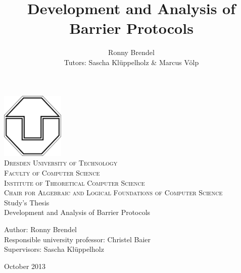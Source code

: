 \documentclass[a4paper, 10pt]{article}
\title{Development and Analysis of Barrier Protocols}
\author{Ronny Brendel\\Tutors: Sascha Kl\"uppelholz \& Marcus V\"olp}
\begin{document}
\begin{titlepage}

\begin{center}
\includegraphics[width=3cm]{tu-logo}~\\[1cm]
\textsc{\LARGE Dresden University of Technology}\\[0.5cm]
\textsc{\Large Faculty of Computer Science}\\[0.2cm]
\textsc{\large Institute of Theoretical Computer Science}\\[0.2cm]
\textsc{\large Chair for Algebraic and Logical Foundations of Computer Science}\\[3cm]
\Huge Study's Thesis \\[1cm]
\huge Development and Analysis of Barrier Protocols\\[3cm]
\end{center}

\begin{flushleft} \large
	Author: Ronny Brendel \\
	Responsible university professor: Christel Baier \\
	Supervisors: Sascha Kl\"uppelholz
\end{flushleft}

\vfill
\begin{flushright}
	\large October 2013
\end{flushright}

\end{titlepage}

\pagebreak
\newpage \thispagestyle{empty} \mbox{}
\pagebreak

\thispagestyle{empty}
\end{document}

